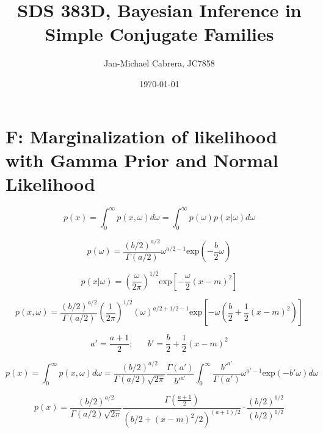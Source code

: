 \documentclass[12pt]{article}
\begin{document}
    \title{SDS 383D, Bayesian Inference in Simple Conjugate Families}
    \author{Jan-Michael Cabrera, JC7858}
    \date{\today}
    \maketitle

    \section*{F: Marginalization of likelihood with Gamma Prior and Normal Likelihood}

        \begin{equation}
              p(x) = \int_0^{\infty} p(x,\omega)d\omega = \int_0^{\infty} p(\omega)p(x|\omega)d\omega
        \end{equation}

        \begin{equation}
              p(\omega) = \frac{(b/2)^{a/2}}{\Gamma(a/2)}{\omega}^{a/2-1} \text{exp}\left (-\frac{b}{2}\omega \right)
        \end{equation}

        \begin{equation}
              p(x|\omega) = \left( \frac{\omega}{2 \pi}\right)^{1/2} \text{exp} \left [ -\frac{\omega}{2}(x - m)^2\right]
        \end{equation}

        \begin{equation}
              p(x,\omega) = \frac{(b/2)^{a/2}}{\Gamma(a/2)}  \left( \frac{1}{2 \pi}\right)^{1/2} (\omega)^{a/2+1/2-1}\text{exp}\left[-\omega \left( \frac{b}{2} + \frac{1}{2}(x - m)^2\right) \right]
        \end{equation}

        \begin{equation}
              a' = \frac{a+1}{2}; \hspace{20pt} b'= \frac{b}{2} + \frac{1}{2}(x-m)^2
        \end{equation}

        \begin{equation}
              p(x) = \int_0^{\infty}p(x, \omega) d\omega = \frac{(b/2)^{a/2}}{\Gamma(a/2) \sqrt{2\pi}} \frac{\Gamma(a')}{b'^{a'}} \int_0^{\infty} \frac{b'^{a'}}{\Gamma(a')}\omega^{a'-1} \text{exp}(-b' \omega) d\omega
        \end{equation}

        \begin{equation}
              p(x) = \frac{(b/2)^{a/2}}{\Gamma(a/2) \sqrt{2\pi}} \frac{\Gamma(\frac{a+1}{2})}{(b/2 + (x-m)^2/2)^{(a+1)/2}} \cdot \frac{(b/2)^{1/2}}{(b/2)^{1/2}}
        \end{equation}
\end{document}
